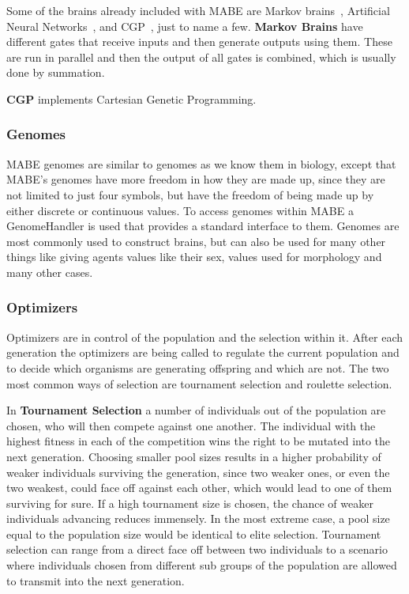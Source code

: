 \documentclass[12pt,oneside,listof=totoc,paper=a4,headings=small]{scrbook}
\begin{document}
Some of the brains already included with MABE are Markov brains~\cite{hintze2017markov}, Artificial Neural Networks~\cite{russell1995modern}, and CGP~\cite{miller2008cartesian}, just to name a few. 
\newpage
\textbf{Markov Brains} have different gates that receive inputs and then generate outputs using them. These are run in parallel and then the output of all gates is combined, which is usually done by summation.

\textbf{CGP} implements Cartesian Genetic Programming.

\subsubsection{Genomes}
MABE genomes are similar to genomes as we know them in biology, except that MABE's genomes have more freedom in how they are made up, since they are not limited to just four symbols, but have the freedom of being made up by either discrete or continuous values. To access genomes within MABE a GenomeHandler is used that provides a standard interface to them. Genomes are most commonly used to construct brains, but can also be used for many other things like giving agents values like their sex, values used for morphology and many other cases. 

\subsubsection{Optimizers}
Optimizers are in control of the population and the selection within it. After each generation the optimizers are being called to regulate the current population and to decide which organisms are generating offspring and which are not.
The two most common ways of selection are tournament selection and roulette selection.

In \textbf{Tournament Selection} a number of individuals out of the population are chosen, who will then compete against one another. The individual with the highest fitness in each of the competition wins the right to be mutated into the next generation. Choosing smaller pool sizes results in a higher probability of weaker individuals surviving the generation, since two weaker ones, or even the two weakest, could face off against each other, which would lead to one of them surviving for sure. If a high tournament size is chosen, the chance of weaker individuals advancing reduces immensely. In the most extreme case, a pool size equal to the population size would be identical to elite selection. Tournament selection can range from a direct face off between two individuals to a scenario where individuals chosen from different sub groups of the population are allowed to transmit into the next generation.  
\end{document}
